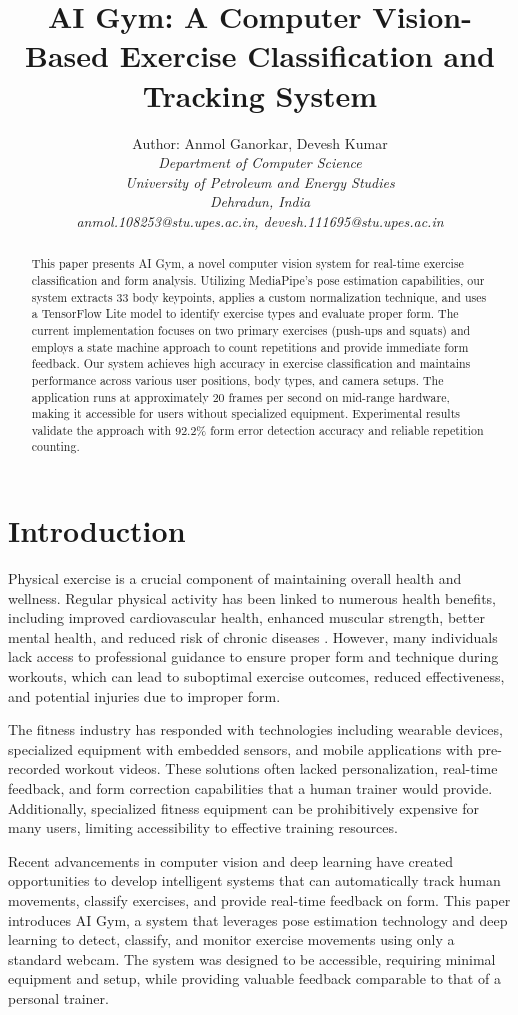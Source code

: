 \documentclass[11pt]{article}
\title{\textbf{AI Gym: A Computer Vision-Based Exercise Classification and Tracking System}}
\author{Author: Anmol Ganorkar, Devesh Kumar \\
\textit{Department of Computer Science}\\
\textit{University of Petroleum and Energy Studies}\\
\textit{Dehradun, India}\\
\textit{anmol.108253@stu.upes.ac.in,               
devesh.111695@stu.upes.ac.in 
}
}
\begin{document}
\maketitle

\begin{abstract}
This paper presents AI Gym, a novel computer vision system for real-time exercise classification and form analysis. Utilizing MediaPipe's pose estimation capabilities, our system extracts 33 body keypoints, applies a custom normalization technique, and uses a TensorFlow Lite model to identify exercise types and evaluate proper form. The current implementation focuses on two primary exercises (push-ups and squats) and employs a state machine approach to count repetitions and provide immediate form feedback. Our system achieves high accuracy in exercise classification and maintains performance across various user positions, body types, and camera setups. The application runs at approximately 20 frames per second on mid-range hardware, making it accessible for users without specialized equipment. Experimental results validate the approach with 92.2\% form error detection accuracy and reliable repetition counting.
\end{abstract}


\section{Introduction}
Physical exercise is a crucial component of maintaining overall health and wellness. Regular physical activity has been linked to numerous health benefits, including improved cardiovascular health, enhanced muscular strength, better mental health, and reduced risk of chronic diseases \cite{warburton2006}. However, many individuals lack access to professional guidance to ensure proper form and technique during workouts, which can lead to suboptimal exercise outcomes, reduced effectiveness, and potential injuries due to improper form.

The fitness industry has responded with technologies including wearable devices, specialized equipment with embedded sensors, and mobile applications with pre-recorded workout videos. These solutions often lacked personalization, real-time feedback, and form correction capabilities that a human trainer would provide. Additionally, specialized fitness equipment can be prohibitively expensive for many users, limiting accessibility to effective training resources.

Recent advancements in computer vision and deep learning have created opportunities to develop intelligent systems that can automatically track human movements, classify exercises, and provide real-time feedback on form. This paper introduces AI Gym, a system that leverages pose estimation technology and deep learning to detect, classify, and monitor exercise movements using only a standard webcam. The system was designed to be accessible, requiring minimal equipment and setup, while providing valuable feedback comparable to that of a personal trainer.
\end{document}
